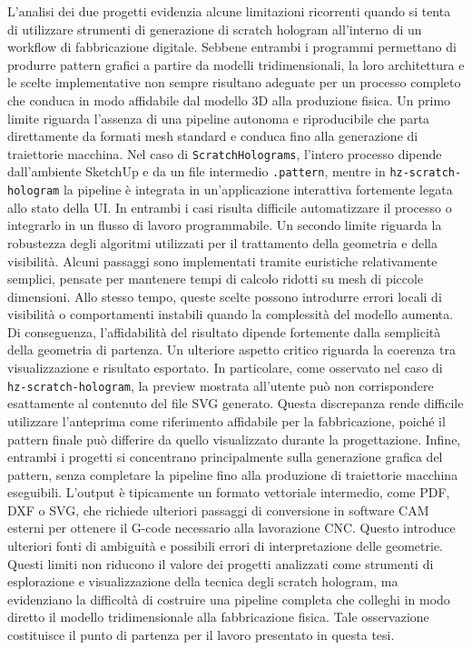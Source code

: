 \documentclass[a4paper,11pt,titlepage,twoside]{book}
\newcommand{\1}{\mathbf{1}}
\numberwithin{equation}{chapter}
\theoremstyle{plain}
\theoremstyle{definition}
\begin{document}
	L’analisi dei due progetti evidenzia alcune limitazioni ricorrenti quando si tenta di utilizzare strumenti di generazione di scratch hologram all’interno di un workflow di fabbricazione digitale. Sebbene entrambi i programmi permettano di produrre pattern grafici a partire da modelli tridimensionali, la loro architettura e le scelte implementative non sempre risultano adeguate per un processo completo che conduca in modo affidabile dal modello 3D alla produzione fisica.
	Un primo limite riguarda l’assenza di una pipeline autonoma e riproducibile che parta direttamente da formati mesh standard e conduca fino alla generazione di traiettorie macchina. Nel caso di \texttt{ScratchHolograms}, l’intero processo dipende dall’ambiente SketchUp e da un file intermedio \texttt{.pattern}, mentre in \texttt{hz-scratch-hologram} la pipeline è integrata in un’applicazione interattiva fortemente legata allo stato della UI. In entrambi i casi risulta difficile automatizzare il processo o integrarlo in un flusso di lavoro programmabile.
	Un secondo limite riguarda la robustezza degli algoritmi utilizzati per il trattamento della geometria e della visibilità. Alcuni passaggi sono implementati tramite euristiche relativamente semplici, pensate per mantenere tempi di calcolo ridotti su mesh di piccole dimensioni. Allo stesso tempo, queste scelte possono introdurre errori locali di visibilità o comportamenti instabili quando la complessità del modello aumenta. Di conseguenza, l’affidabilità del risultato dipende fortemente dalla semplicità della geometria di partenza.
	Un ulteriore aspetto critico riguarda la coerenza tra visualizzazione e risultato esportato. In particolare, come osservato nel caso di \texttt{hz-scratch-hologram}, la preview mostrata all’utente può non corrispondere esattamente al contenuto del file SVG generato. Questa discrepanza rende difficile utilizzare l’anteprima come riferimento affidabile per la fabbricazione, poiché il pattern finale può differire da quello visualizzato durante la progettazione.
	Infine, entrambi i progetti si concentrano principalmente sulla generazione grafica del pattern, senza completare la pipeline fino alla produzione di traiettorie macchina eseguibili. L’output è tipicamente un formato vettoriale intermedio, come PDF, DXF o SVG, che richiede ulteriori passaggi di conversione in software CAM esterni per ottenere il G-code necessario alla lavorazione CNC. Questo introduce ulteriori fonti di ambiguità e possibili errori di interpretazione delle geometrie.
	Questi limiti non riducono il valore dei progetti analizzati come strumenti di esplorazione e visualizzazione della tecnica degli scratch hologram, ma evidenziano la difficoltà di costruire una pipeline completa che colleghi in modo diretto il modello tridimensionale alla fabbricazione fisica. Tale osservazione costituisce il punto di partenza per il lavoro presentato in questa tesi.
	
\end{document}
